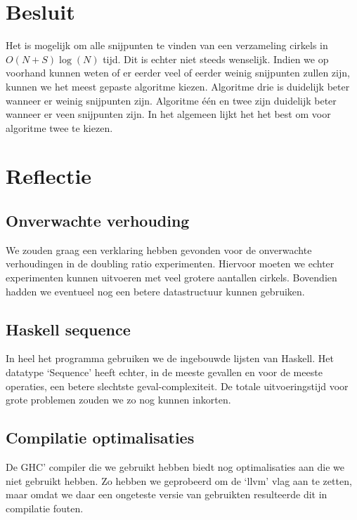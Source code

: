 \newpage
\section{Besluit}
Het is mogelijk om alle snijpunten te vinden van een verzameling cirkels in $O(N+S)\log(N)$ tijd. Dit is echter niet steeds  wenselijk. Indien we op voorhand kunnen weten of er eerder veel of eerder weinig snijpunten zullen zijn, kunnen we het meest gepaste algoritme kiezen.
Algoritme drie is duidelijk beter wanneer er weinig snijpunten zijn. Algoritme \'e\'en en twee zijn duidelijk beter wanneer er veen snijpunten zijn.
In het algemeen lijkt het het best om voor algoritme twee te kiezen.


\section{Reflectie}

\subsection{Onverwachte verhouding}
We zouden graag een verklaring hebben gevonden voor de onverwachte verhoudingen in de doubling ratio experimenten. Hiervoor moeten we echter experimenten kunnen uitvoeren met veel grotere aantallen cirkels. Bovendien hadden we eventueel nog een betere datastructuur kunnen gebruiken.

\subsection{Haskell sequence}
In heel het programma gebruiken we de ingebouwde lijsten van Haskell. Het datatype `Sequence' heeft echter, in de meeste gevallen en voor de meeste operaties, een betere slechtste geval-complexiteit. De totale uitvoeringstijd voor grote problemen zouden we zo nog kunnen inkorten.

\subsection{Compilatie optimalisaties}
De GHC' compiler die we gebruikt hebben biedt nog optimalisaties aan die we niet gebruikt hebben. Zo hebben we geprobeerd om de `llvm' vlag aan te zetten, maar omdat we daar een ongeteste versie van gebruikten resulteerde dit in compilatie fouten.
